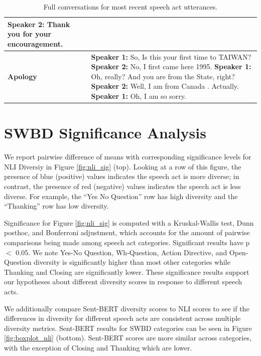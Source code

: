 \documentclass[11pt]{article}
\begin{document}
\begin{table}[ht!]
\begin{tabular}{|p{3cm}|p{11.5cm}|}
\hspace*{0.5cm}\textbf{Speaker 2:} Thank you for your encouragement. \\\hline
     \textbf{Apology}    & \textbf{Speaker 1:} So, Is this your first time to TAIWAN?\newline 
\hspace*{0.5cm} \textbf{Speaker 2:} No, I first came here 1995.\newline 
\textbf{Speaker 1:} Oh, really? And you are from the State, right?\newline 
\hspace*{0.5cm} \textbf{Speaker 2:} Well, I am from Canada . Actually.\newline 
\textbf{Speaker 1:} Oh, I am so sorry.\\\hline
    \end{tabular}
    \caption{Full conversations for most recent speech act utterances.}
    \label{tab:speechact_full_convos}
\end{table}

\section{SWBD Significance Analysis}\label{app:swbd_sig}
We report pairwise difference of means with corresponding significance levels for NLI Diversiy in Figure \ref{fig:nli_sig} (top).  Looking at a row of this figure, the presence of blue (positive) values indicates the speech act is more diverse; in contrast, the presence of red (negative) values indicates the speech act is less diverse.  For example, the ``Yes No Question'' row 
has high diversity and the ``Thanking'' row 
has low diversity.


Significance for Figure \ref{fig:nli_sig} is computed with a Kruskal-Wallis test, Dunn posthoc, and Bonferroni adjustment, which accounts for  the amount of pairwise comparisons being made among speech act categories.  Significant results have p $<$ 0.05.  We note Yes-No Question, Wh-Question, Action Directive, and Open-Question diversity is significantly higher than most other categories while Thanking and Closing are significantly lower.  These significance results support our hypotheses about different diversity scores in response to different speech acts.



We additionally compare Sent-BERT diversity scores to NLI scores to see if the differences in diversity for different speech acts are consistent across multiple diversity metrics.  Sent-BERT results for SWBD categories can be seen in Figure \ref{fig:boxplot_nli} (bottom).  Sent-BERT scores are more similar across categories, with the exception of Closing and Thanking which are lower.  
\end{document}
